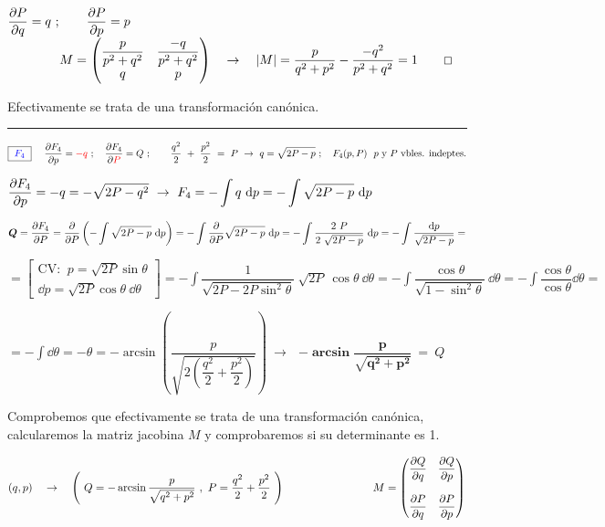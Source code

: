 $\displaystyle \pdv{P}{q}=q \ ;  \qquad \pdv{P}{p}=p$
$ \qquad \qquad M=\mqty( \dfrac{p}{p^2+q^2} & \dfrac{-q}{p^2+q^2} \\ q & p )   \quad   \to \quad | M|= \dfrac {p}{q^2+p^2} - \dfrac{-q^2}{p^2+q^2} = 1 \qquad \Box$

 Efectivamente se trata de una transformación canónica.

\begin{center}
\rule{250pt}{0.1pt}	
\end{center}




\vspace{5mm} $\boxed{ \ \textcolor{blue}{F_4}  \ }  \quad  \  \displaystyle
\pdv{F_4}{p}=\textcolor{red}{-q} \ ; \quad \pdv{F_4}{\textcolor{red}{P}}=Q \ ; \qquad \dfrac {q^2}2 \ + \ \dfrac {p^2}2 \ = \ P  \ \to \ q=\sqrt{2P-p} \ ;
\quad F_4(p,P)\ \ p \text{ y } P \text{\ vbles. indeptes.}$

$\displaystyle \pdv{F_4}{p} = -q = - \sqrt{2P-q^2}  \ \to \ F_4=-\int q \ \dd p=-\int  \sqrt{2P-p} \ \dd p$

$\displaystyle \boldsymbol{Q}= \pdv{F_4}{P}=\pdv{P}\left( -  \int  \sqrt{2P-p} \ \dd p \right) = -\int \pdv{P} \sqrt{2P-p} \ \dd p = -\int \dfrac {2 \ P}{2 \ \sqrt{2P-p}} \ \dd p = -\int \dfrac {\dd p} { \sqrt{2P-p} } =$

$=\displaystyle \left[ \begin{matrix} \text{CV: } \ p=\sqrt{2P} \sin \theta \\ \dd p  =  \sqrt{2P}  \cos \theta  \ \dd \theta \end{matrix} \right] = -\int \dfrac 1{\sqrt{2P-2P\sin^2 \theta}} \ \sqrt{2P} \ \cos \theta \ \dd \theta=
-\int \dfrac{\cos \theta}{\sqrt{1-\sin^2\theta}} \ \dd \theta = -\int \dfrac{\cos \theta}{\cos \theta} \dd \theta =$

$\displaystyle = -\int \dd \theta = -\theta = -\arcsin \left( \dfrac p {\sqrt{2\left( \dfrac {q^2}{2} + \dfrac {p^2}{2} \right) } } \right) \ \to \  \ \boxed{ \ \boldsymbol{- \arcsin \dfrac{p}{\sqrt{q^2+p^2}}} \ = \ Q \ }$

\vspace{5mm} Comprobemos que efectivamente se trata de una transformación canónica, calcularemos la matriz jacobina $M$ y comprobaremos si su determinante es 1.

\vspace{5mm} $(q,p) \quad \to \quad \left( \ Q=-\arcsin \dfrac{p}{\sqrt{q^2+p^2}}\ , \ P =\dfrac{q^2}2 + \dfrac{p^2}2 \ \right) \qquad \qquad  \qquad \qquad M=\mqty( \displaystyle \pdv{Q}{q} & \displaystyle \pdv{Q}{p} \\ \\ \displaystyle \pdv{P}{q} & \displaystyle \pdv{P}{p} ) $




